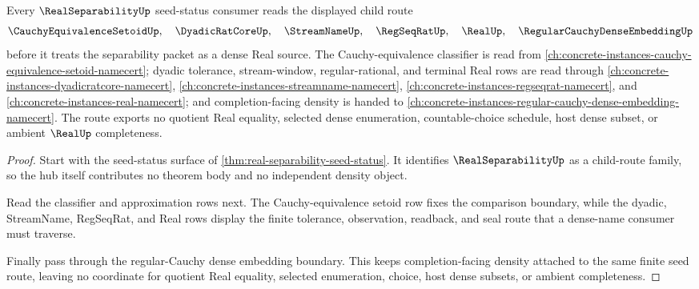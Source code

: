 \begin{theorem}
\label{thm:real-separability-additive-seed-status-route}
Every $\RealSeparabilityUp$ seed-status consumer reads the displayed child route
$$
\CauchyEquivalenceSetoidUp,\quad
\DyadicRatCoreUp,\quad
\StreamNameUp,\quad
\RegSeqRatUp,\quad
\RealUp,\quad
\RegularCauchyDenseEmbeddingUp
$$
before it treats the separability packet as a dense Real source. The Cauchy-equivalence classifier is read from \autoref{ch:concrete-instances-cauchy-equivalence-setoid-namecert}; dyadic tolerance, stream-window, regular-rational, and terminal Real rows are read through \autoref{ch:concrete-instances-dyadicratcore-namecert}, \autoref{ch:concrete-instances-streamname-namecert}, \autoref{ch:concrete-instances-regseqrat-namecert}, and \autoref{ch:concrete-instances-real-namecert}; and completion-facing density is handed to \autoref{ch:concrete-instances-regular-cauchy-dense-embedding-namecert}. The route exports no quotient Real equality, selected dense enumeration, countable-choice schedule, host dense subset, or ambient $\RealUp$ completeness.
\end{theorem}
\begin{proof}
Start with the seed-status surface of \autoref{thm:real-separability-seed-status}. It identifies $\RealSeparabilityUp$ as a child-route family, so the hub itself contributes no theorem body and no independent density object.

Read the classifier and approximation rows next. The Cauchy-equivalence setoid row fixes the comparison boundary, while the dyadic, StreamName, RegSeqRat, and Real rows display the finite tolerance, observation, readback, and seal route that a dense-name consumer must traverse.

Finally pass through the regular-Cauchy dense embedding boundary. This keeps completion-facing density attached to the same finite seed route, leaving no coordinate for quotient Real equality, selected enumeration, choice, host dense subsets, or ambient completeness.
\end{proof}
